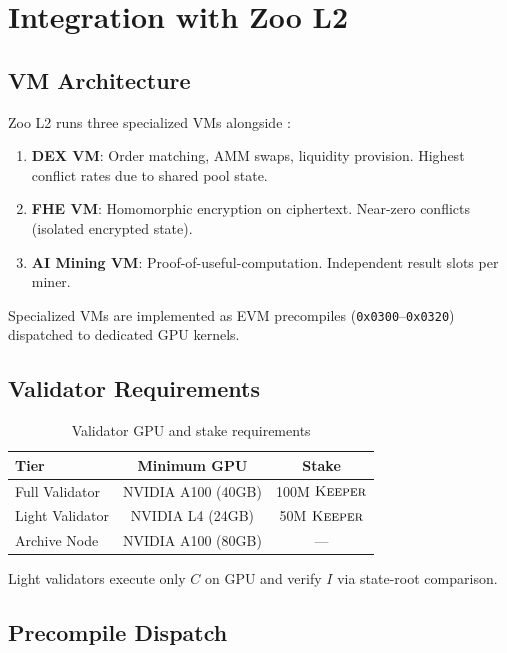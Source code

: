 \section{Integration with Zoo L2}

\label{sec:integration}

\subsection{VM Architecture}

Zoo L2 runs three specialized VMs alongside \cevm{}:

\begin{enumerate}[leftmargin=*]
\item \textbf{DEX VM}: Order matching, AMM swaps, liquidity provision. Highest conflict rates due to shared pool state.
\item \textbf{FHE VM}: Homomorphic encryption on ciphertext. Near-zero conflicts (isolated encrypted state).
\item \textbf{AI Mining VM}: Proof-of-useful-computation. Independent result slots per miner.
\end{enumerate}

Specialized VMs are implemented as EVM precompiles (\texttt{0x0300}--\texttt{0x0320}) dispatched to dedicated GPU kernels.

\subsection{Validator Requirements}

\begin{table}[h]
\centering
\begin{tabular}{lcc}
\toprule
\textbf{Tier} & \textbf{Minimum GPU} & \textbf{Stake} \\
\midrule
Full Validator & NVIDIA A100 (40GB) & 100M $\textsc{Keeper}$ \\
Light Validator & NVIDIA L4 (24GB) & 50M $\textsc{Keeper}$ \\
Archive Node & NVIDIA A100 (80GB) & --- \\
\bottomrule
\end{tabular}
\caption{Validator GPU and stake requirements}
\label{tab:validator-gpu}
\end{table}

Light validators execute only $C$ on GPU and verify $I$ via state-root comparison.

\subsection{Precompile Dispatch}

